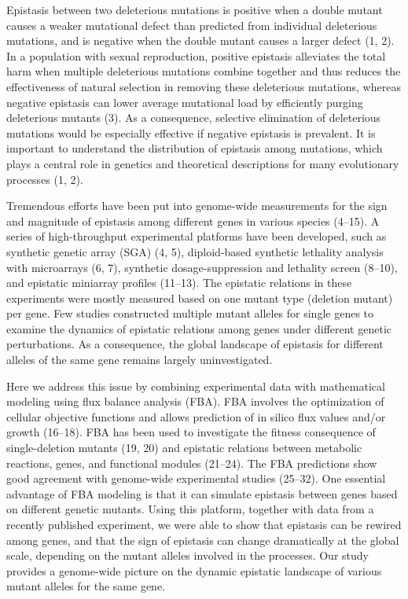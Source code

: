 Epistasis between two deleterious mutations is positive when a double
mutant causes a weaker mutational defect than predicted from
individual deleterious mutations, and is negative when the double
mutant causes a larger defect (1, 2). In a population with sexual
reproduction, positive epistasis alleviates the total harm when
multiple deleterious mutations combine together and thus reduces the
effectiveness of natural selection in removing these deleterious
mutations, whereas negative epistasis can lower average mutational
load by efficiently purging deleterious mutants (3). As a consequence,
selective elimination of deleterious mutations would be especially
effective if negative epistasis is prevalent. It is important to
understand the distribution of epistasis among mutations, which plays
a central role in genetics and theoretical descriptions for many
evolutionary processes (1, 2).

Tremendous efforts have been put into genome-wide measurements for the
sign and magnitude of epistasis among different genes in various
species (4–15). A series of high-throughput experimental platforms
have been developed, such as synthetic genetic array (SGA) (4, 5),
diploid-based synthetic lethality analysis with microarrays (6, 7),
synthetic dosage-suppression and lethality screen (8–10), and
epistatic miniarray profiles (11–13). The epistatic relations in these
experiments were mostly measured based on one mutant type (deletion
mutant) per gene. Few studies constructed multiple mutant alleles for
single genes to examine the dynamics of epistatic relations among
genes under different genetic perturbations. As a consequence, the
global landscape of epistasis for different alleles of the same gene
remains largely uninvestigated.

Here we address this issue by combining experimental data with
mathematical modeling using flux balance analysis (FBA). FBA involves
the optimization of cellular objective functions and allows prediction
of in silico flux values and/or growth (16–18). FBA has been used to
investigate the fitness consequence of single-deletion mutants (19,
20) and epistatic relations between metabolic reactions, genes, and
functional modules (21–24). The FBA predictions show good agreement
with genome-wide experimental studies (25–32). One essential advantage
of FBA modeling is that it can simulate epistasis between genes based
on different genetic mutants. Using this platform, together with data
from a recently published experiment, we were able to show that
epistasis can be rewired among genes, and that the sign of epistasis
can change dramatically at the global scale, depending on the mutant
alleles involved in the processes. Our study provides a genome-wide
picture on the dynamic epistatic landscape of various mutant alleles
for the same gene.

